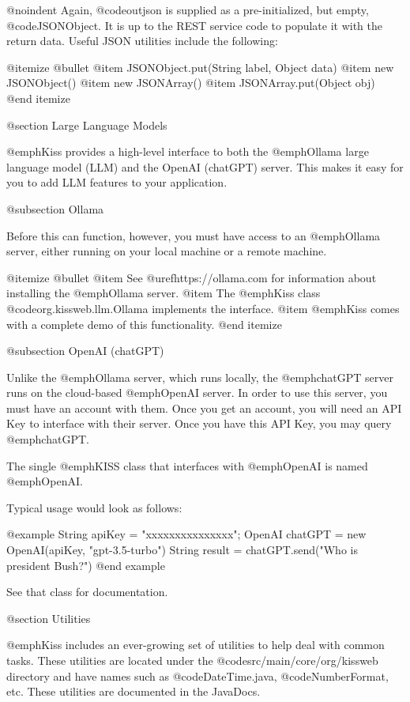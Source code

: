 @noindent
Again, @code{outjson} is supplied as a pre-initialized, but empty,
@code{JSONObject}.  It is up to the REST service code to populate it
with the return data.  Useful JSON utilities include the following:

@itemize @bullet
@item
JSONObject.put(String label, Object data)
@item
new JSONObject()
@item
new JSONArray()
@item
JSONArray.put(Object obj)
@end itemize

@section Large Language Models

@emph{Kiss} provides a high-level interface to both the @emph{Ollama} large language model (LLM) and the OpenAI (chatGPT) server. This makes it easy for you to add LLM features to your application.

@subsection Ollama

Before this can function, however, you must have access to an @emph{Ollama} server, either running on your local machine or a remote machine.

@itemize @bullet
@item
See @uref{https://ollama.com} for information about installing the @emph{Ollama} server.
@item
The @emph{Kiss} class @code{org.kissweb.llm.Ollama} implements the interface.
@item
@emph{Kiss} comes with a complete demo of this functionality.
@end itemize

@subsection OpenAI (chatGPT)

Unlike the @emph{Ollama} server, which runs locally, the @emph{chatGPT}
server runs on the cloud-based @emph{OpenAI} server.  In order to use
this server, you must have an account with them.  Once you get an
account, you will need an API Key to interface with their server.
Once you have this API Key, you may query @emph{chatGPT}.

The single @emph{KISS} class that interfaces with @emph{OpenAI} is
named @emph{OpenAI}.  

Typical usage would look as follows:

@example
    String apiKey = "xxxxxxxxxxxxxxx";
    OpenAI chatGPT = new OpenAI(apiKey, "gpt-3.5-turbo")
    String result = chatGPT.send("Who is president Bush?")
@end example

See that class for documentation.

@section Utilities

@emph{Kiss} includes an ever-growing set of utilities to help deal with common tasks.
These utilities are located under the @code{src/main/core/org/kissweb} directory and have names such as
@code{DateTime.java}, @code{NumberFormat}, etc.  These utilities
are documented in the JavaDocs.
